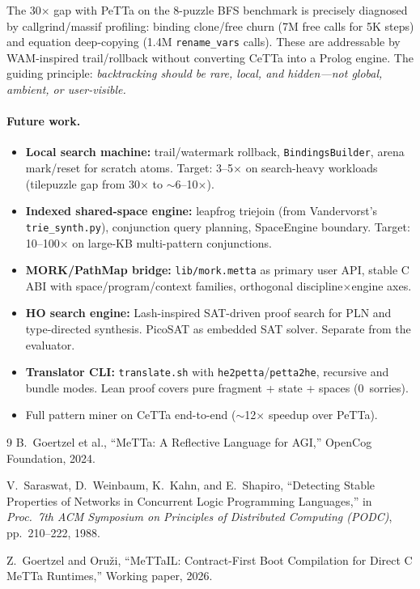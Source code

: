 \documentclass[11pt]{article}
\newcommand{\code}[1]{\texttt{#1}}
\newcommand{\PeTTa}{\textup{PeTTa}}
\newcommand{\CeTTa}{\textup{CeTTa}}
\begin{document}
The 30$\times$ gap with \PeTTa{} on the 8-puzzle BFS benchmark
is precisely diagnosed by callgrind/massif profiling: binding
clone/free churn (7M free calls for 5K steps) and equation
deep-copying (1.4M \code{rename\_vars} calls).  These are
addressable by WAM-inspired trail/rollback without converting
\CeTTa{} into a Prolog engine.  The guiding principle:
\emph{backtracking should be rare, local, and hidden---not global,
ambient, or user-visible.}

\paragraph{Future work.}
\begin{itemize}
\item \textbf{Local search machine:} trail/watermark rollback,
  \code{BindingsBuilder}, arena mark/reset for scratch atoms.
  Target: 3--5$\times$ on search-heavy workloads (tilepuzzle gap
  from 30$\times$ to $\sim$6--10$\times$).
\item \textbf{Indexed shared-space engine:} leapfrog triejoin
  (from Vandervorst's \code{trie\_synth.py}), conjunction query
  planning, SpaceEngine boundary.  Target: 10--100$\times$ on
  large-KB multi-pattern conjunctions.
\item \textbf{MORK/PathMap bridge:} \code{lib/mork.metta} as
  primary user API, stable C ABI with space/program/context
  families, orthogonal discipline$\times$engine axes.
\item \textbf{HO search engine:} Lash-inspired SAT-driven proof
  search for PLN and type-directed synthesis.  PicoSAT as
  embedded SAT solver.  Separate from the evaluator.
\item \textbf{Translator CLI:} \code{translate.sh} with
  \code{he2petta}/\code{petta2he}, recursive and bundle modes.
  Lean proof covers pure fragment + state + spaces (0~sorries).
\item Full pattern miner on \CeTTa{} end-to-end
  ($\sim$12$\times$ speedup over \PeTTa{}).
\end{itemize}

\begin{thebibliography}{9}
  B.~Goertzel et al.,
  ``MeTTa: A Reflective Language for AGI,''
  OpenCog Foundation, 2024.

  V.~Saraswat, D.~Weinbaum, K.~Kahn, and E.~Shapiro,
  ``Detecting Stable Properties of Networks in Concurrent Logic
  Programming Languages,''
  in \emph{Proc.\ 7th ACM Symposium on Principles of Distributed
  Computing (PODC)}, pp.~210--222, 1988.

  Z.~Goertzel and Oru\v{z}i,
  ``MeTTaIL: Contract-First Boot Compilation for Direct C MeTTa Runtimes,''
  Working paper, 2026.
\end{thebibliography}
\end{document}
